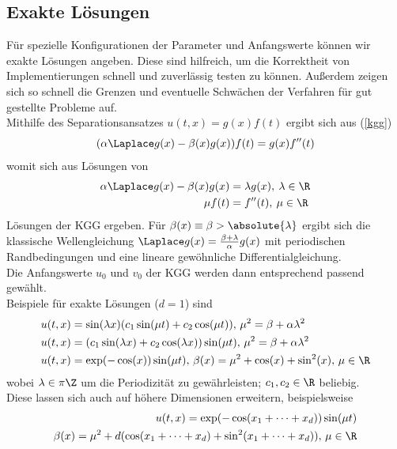 \subsection{Exakte Lösungen}
Für spezielle Konfigurationen der Parameter und Anfangswerte können wir exakte Lösungen angeben. Diese sind hilfreich, um die Korrektheit von Implementierungen schnell und zuverlässig testen zu können. Außerdem zeigen sich so schnell die Grenzen und eventuelle Schwächen der Verfahren für gut gestellte Probleme auf.\\[1cm]
Mithilfe des Separationsansatzes $u(t,x)=g(x)f(t)$ ergibt sich aus (\ref{kgg}) 
\begin{equation*}
(\alpha\Laplace g(x)-\beta(x)g(x))f(t) = g(x)f''(t)
\end{equation*}
womit sich aus Lösungen von
\begin{align*}
\alpha\Laplace g(x)-\beta(x)g(x)&=\lambda g(x), \: \lambda\in\R\\
\mu f(t)&=f''(t), \: \mu\in \R
\end{align*}
Lösungen der KGG ergeben. Für $\beta(x) \equiv \beta>\absolute{\lambda}$ ergibt sich die klassische Wellengleichung $\Laplace g(x)=\frac{\beta + \lambda}{\alpha}g(x)$ mit periodischen Randbedingungen und eine lineare gewöhnliche Differentialgleichung.\\Die Anfangswerte $u_0$ und $v_0$ der KGG werden dann entsprechend passend gewählt.\\[1cm]
Beispiele für exakte Lösungen ($d=1$) sind
\begin{align*}
u(t,x)&=\sin(\lambda x)(c_1 \sin(\mu t) + c_2 \cos(\mu t)), \, \mu^2=\beta+\alpha \lambda^2\\ 
u(t,x)&=(c_1 \sin(\lambda x) + c_2 \cos(\lambda x))\sin(\mu t), \, \mu^2=\beta+\alpha \lambda^2\\
u(t,x)&=\exp(-\cos(x))\sin(\mu t), \, \beta(x)=\mu^2+\cos(x)+\sin^2(x), \, \mu \in \R
\end{align*}
wobei $\lambda\in \pi\Z$ um die Periodizität zu gewährleisten; $c_1, c_2 \in \R$ beliebig.\\
Diese lassen sich auch auf höhere Dimensionen erweitern, beispielsweise
\begin{eqnarray}
u(t,x)=\exp(-\cos(x_1+\dots+x_d))\sin(\mu t)\\
\beta(x)=\mu^2+d(\cos(x_1+\dots+x_d)+\sin^2(x_1+\dots+x_d)), \, \mu\in\R \nonumber
\end{eqnarray}

